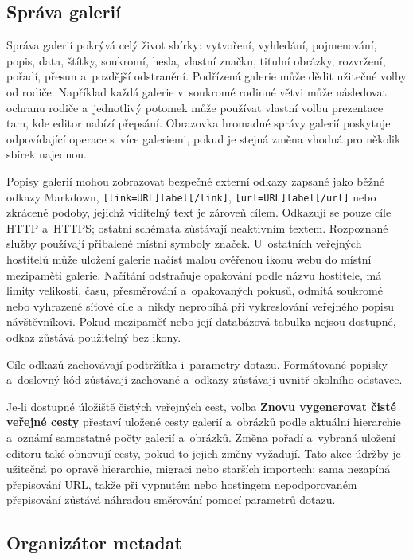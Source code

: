 \documentclass[11pt,a4paper]{article}
\newcommand{\ui}[1]{\textbf{#1}}
\newcommand{\codeword}[1]{\nolinkurl{#1}}
\begin{document}
\subsection{Správa galerií}

Správa galerií pokrývá celý život sbírky: vytvoření, vyhledání, pojmenování,
popis, data, štítky, soukromí, hesla, vlastní značku, titulní obrázky,
rozvržení, pořadí, přesun a~pozdější odstranění. Podřízená galerie může dědit
užitečné volby od rodiče. Například každá galerie v~soukromé rodinné větvi může
následovat ochranu rodiče a~jednotlivý potomek může používat vlastní volbu
prezentace tam, kde editor nabízí přepsání. Obrazovka hromadné správy galerií
poskytuje odpovídající operace s~více galeriemi, pokud je stejná změna vhodná
pro několik sbírek najednou.

Popisy galerií mohou zobrazovat bezpečné externí odkazy zapsané jako běžné
odkazy Markdown, \codeword{[link=URL]label[/link]},
\codeword{[url=URL]label[/url]} nebo zkrácené podoby, jejichž viditelný text je
zároveň cílem. Odkazují se pouze cíle HTTP a~HTTPS; ostatní schémata zůstávají
neaktivním textem. Rozpoznané služby používají přibalené místní symboly značek.
U~ostatních veřejných hostitelů může uložení galerie načíst malou ověřenou ikonu
webu do místní mezipaměti galerie. Načítání odstraňuje opakování podle názvu
hostitele, má limity velikosti, času, přesměrování a~opakovaných pokusů, odmítá
soukromé nebo vyhrazené síťové cíle a~nikdy neprobíhá při vykreslování veřejného
popisu návštěvníkovi. Pokud mezipaměť nebo její databázová tabulka nejsou
dostupné, odkaz zůstává použitelný bez ikony.

Cíle odkazů zachovávají podtržítka i~parametry dotazu. Formátované popisky
a~doslovný kód zůstávají zachované a~odkazy zůstávají uvnitř okolního odstavce.

Je-li dostupné úložiště čistých veřejných cest, volba \ui{Znovu vygenerovat
čisté veřejné cesty} přestaví uložené cesty galerií a~obrázků podle aktuální
hierarchie a~oznámí samostatné počty galerií a~obrázků. Změna pořadí a~vybraná
uložení editoru také obnovují cesty, pokud to jejich změny vyžadují. Tato akce
údržby je užitečná po opravě hierarchie, migraci nebo starších importech; sama
nezapíná přepisování URL, takže při vypnutém nebo hostingem nepodporovaném
přepisování zůstává náhradou směrování pomocí parametrů dotazu.
\subsection{Organizátor metadat}
\end{document}
